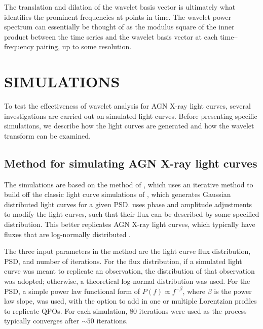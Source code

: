 \documentclass[fleqn,usenatbib]{mnras}
\begin{document}
The translation and dilation of the wavelet basis vector is ultimately what identifies the prominent frequencies at points in time. The wavelet power spectrum can essentially be thought of as the modulus square of the inner product between the time series and the wavelet basis vector at each time--frequency pairing, up to some resolution.



\section{SIMULATIONS}

To test the effectiveness of wavelet analysis for AGN X-ray light curves, several investigations are carried out on simulated light curves.  Before presenting specific simulations, we describe how the light curves are generated and how the wavelet transform can be examined.

\subsection{Method for simulating AGN X-ray light curves} \label{lc_sim_section} 

The simulations are based on the method of \cite{emmanoulopoulos2013generating}, which uses an iterative method to build off the classic light curve simulations of  \cite{timmer1995generating}, which generates Gaussian distributed light curves for a given PSD. \cite{emmanoulopoulos2013generating} uses phase and amplitude adjustments to modify the \citet{timmer1995generating} light curves, such that their flux can be described by some specified distribution. This better replicates AGN X-ray light curves, which typically have fluxes that are log-normally distributed \citep{uttley2005nonlinear}.

The three input parameters in the \citet{emmanoulopoulos2013generating} method are the light curve flux distribution, PSD, and number of iterations. For the flux distribution, if a simulated light curve was meant to replicate an observation, the distribution of that observation was adopted; otherwise, a theoretical log-normal distribution was used. For the PSD, a simple power law functional form of $P\left(f\right) \propto f^{-\beta}$, where $\beta$ is the power law slope, was used, with the option to add in one or multiple Lorentzian profiles to replicate QPOs. For each simulation, 80 iterations were used as the process typically converges after $\sim 50$ iterations.
\end{document}
